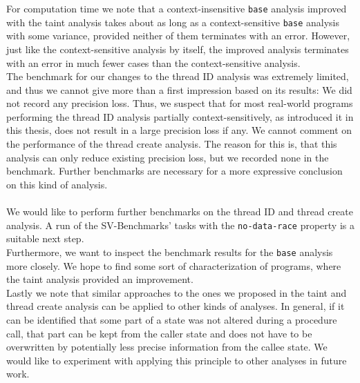   For computation time we note that a context-insensitive \texttt{base} analysis improved with the taint analysis takes about as long as a context-sensitive \texttt{base} analysis with some variance, provided neither of them terminates with an error. However, just like the context-sensitive analysis by itself, the improved analysis terminates with an error in much fewer cases than the context-sensitive analysis.\\
  The benchmark for our changes to the thread ID analysis was extremely limited, and thus we cannot give more than a first impression based on its results: We did not record any precision loss. Thus, we suspect that for most real-world programs performing the thread ID analysis partially context-sensitively, as introduced it in this thesis, does not result in a large precision loss if any. We cannot comment on the performance of the thread create analysis. The reason for this is, that this analysis can only reduce existing precision loss, but we recorded none in the benchmark. Further benchmarks are necessary for a more expressive conclusion on this kind of analysis.\\
  \\
  We would like to perform further benchmarks on the thread ID and thread create analysis. A run of the SV-Benchmarks' tasks with the \texttt{no-data-race} property is a suitable next step.\\
  Furthermore, we want to inspect the benchmark results for the \texttt{base} analysis more closely. We hope to find some sort of characterization of programs, where the taint analysis provided an improvement.\\
  Lastly we note that similar approaches to the ones we proposed in the taint and thread create analysis can be applied to other kinds of analyses. In general, if it can be identified that some part of a state was not altered during a procedure call, that part can be kept from the caller state and does not have to be overwritten by potentially less precise information from the callee state. We would like to experiment with applying this principle to other analyses in future work.\\

